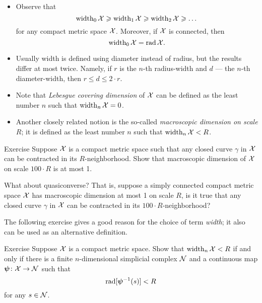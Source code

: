 
\begin{itemize} 
\item Observe that 
\[\operatorname{\rm width}\nolimits_0\mathcal{X}\geqslant\operatorname{\rm width}\nolimits_1\mathcal{X}\geqslant\operatorname{\rm width}\nolimits_2\mathcal{X}\geqslant\dots\]
for any compact metric space $\mathcal{X}$.
Moreover, if $\mathcal{X}$ is connected, then 
\[\operatorname{\rm width}\nolimits_0\mathcal{X}=\mathop{\rm rad}\nolimits\mathcal{X}.\]

\item Usually width is defined using diameter instead of radius, but the results differ at most twice.
Namely, if $r$ is the $n$-th radius-width and $d$ --- the $n$-th diameter-width, then 
$r\le d\le 2\cdot r$.

\item Note that \emph{Lebesgue covering dimension} of $\mathcal{X}$ can be defined as the least number $n$ such that $\operatorname{\rm width}\nolimits_n\mathcal{X}=0$.

\item Another closely related notion is the so-called \emph{macroscopic dimension on scale $R$};
it is defined as the  least number $n$ such that $\operatorname{\rm width}\nolimits_n\mathcal{X}<R$.
\end{itemize}



\begin{thm}{Exercise}\label{ex:macrodimension}
Suppose $\mathcal{X}$ is a compact metric space such that any closed curve $\gamma$ in $\mathcal{X}$ can be contracted in its $R$-neighborhood.
Show that macroscopic dimension of $\mathcal{X}$ on scale $100\cdot R$ is at most 1.

What about quasiconverse? That is, suppose a simply connected compact metric space $\mathcal{X}$ has macroscopic dimension at most 1 on scale $R$, is it true that any closed curve $\gamma$ in $\mathcal{X}$ can be contracted in its $100\cdot R$-neighborhood?
\end{thm}


The following exercise gives a good reason for the choice of term \emph{width}; it also can be used as an alternative definition.

\begin{thm}{Exercise}\label{ex:width=suprad(inv)}
Suppose $\mathcal{X}$ is a compact metric space.
Show that $\operatorname{\rm width}\nolimits_n\mathcal{X}<R$ if and only if there is a finite $n$-dimensional simplicial complex $\mathcal{N}$ and a continuous map $\bm{\psi}\colon\mathcal{X}\to \mathcal{N}$
such that 
\[\mathop{\rm rad}\nolimits[\bm{\psi}^{-1}(s)]<R\]
for any $s\in \mathcal{N}$.
\end{thm}

